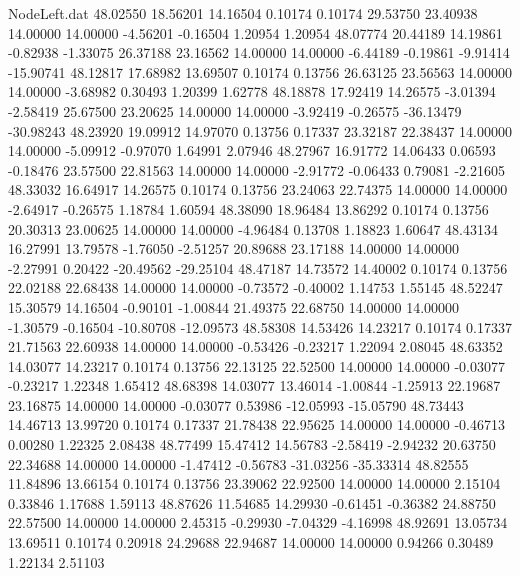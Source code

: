 \begin{filecontents}{NodeLeft.dat}
  48.02550   18.56201   14.16504     0.10174    0.10174   29.53750   23.40938   14.00000   14.00000   -4.56201   -0.16504    1.20954    1.20954
  48.07774   20.44189   14.19861    -0.82938   -1.33075   26.37188   23.16562   14.00000   14.00000   -6.44189   -0.19861   -9.91414  -15.90741
  48.12817   17.68982   13.69507     0.10174    0.13756   26.63125   23.56563   14.00000   14.00000   -3.68982    0.30493    1.20399    1.62778
  48.18878   17.92419   14.26575    -3.01394   -2.58419   25.67500   23.20625   14.00000   14.00000   -3.92419   -0.26575  -36.13479  -30.98243
  48.23920   19.09912   14.97070     0.13756    0.17337   23.32187   22.38437   14.00000   14.00000   -5.09912   -0.97070    1.64991    2.07946
  48.27967   16.91772   14.06433     0.06593   -0.18476   23.57500   22.81563   14.00000   14.00000   -2.91772   -0.06433    0.79081   -2.21605
  48.33032   16.64917   14.26575     0.10174    0.13756   23.24063   22.74375   14.00000   14.00000   -2.64917   -0.26575    1.18784    1.60594
  48.38090   18.96484   13.86292     0.10174    0.13756   20.30313   23.00625   14.00000   14.00000   -4.96484    0.13708    1.18823    1.60647
  48.43134   16.27991   13.79578    -1.76050   -2.51257   20.89688   23.17188   14.00000   14.00000   -2.27991    0.20422  -20.49562  -29.25104
  48.47187   14.73572   14.40002     0.10174    0.13756   22.02188   22.68438   14.00000   14.00000   -0.73572   -0.40002    1.14753    1.55145
  48.52247   15.30579   14.16504    -0.90101   -1.00844   21.49375   22.68750   14.00000   14.00000   -1.30579   -0.16504  -10.80708  -12.09573
  48.58308   14.53426   14.23217     0.10174    0.17337   21.71563   22.60938   14.00000   14.00000   -0.53426   -0.23217    1.22094    2.08045
  48.63352   14.03077   14.23217     0.10174    0.13756   22.13125   22.52500   14.00000   14.00000   -0.03077   -0.23217    1.22348    1.65412
  48.68398   14.03077   13.46014    -1.00844   -1.25913   22.19687   23.16875   14.00000   14.00000   -0.03077    0.53986  -12.05993  -15.05790
  48.73443   14.46713   13.99720     0.10174    0.17337   21.78438   22.95625   14.00000   14.00000   -0.46713    0.00280    1.22325    2.08438
  48.77499   15.47412   14.56783    -2.58419   -2.94232   20.63750   22.34688   14.00000   14.00000   -1.47412   -0.56783  -31.03256  -35.33314
  48.82555   11.84896   13.66154     0.10174    0.13756   23.39062   22.92500   14.00000   14.00000    2.15104    0.33846    1.17688    1.59113
  48.87626   11.54685   14.29930    -0.61451   -0.36382   24.88750   22.57500   14.00000   14.00000    2.45315   -0.29930   -7.04329   -4.16998
  48.92691   13.05734   13.69511     0.10174    0.20918   24.29688   22.94687   14.00000   14.00000    0.94266    0.30489    1.22134    2.51103

\end{filecontents}
